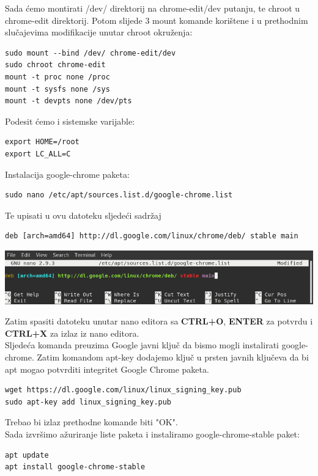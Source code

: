 \documentclass[12pt,vi]{mitthesis}
\begin{document}
Sada ćemo montirati /dev/ direktorij na chrome-edit/dev putanju, te chroot u chrome-edit direktorij. Potom slijede 3 mount komande korištene i u prethodnim slučajevima modifikacije unutar chroot okruženja:
\begin{lstlisting}[style=BashInputStyle]
sudo mount --bind /dev/ chrome-edit/dev
sudo chroot chrome-edit
mount -t proc none /proc
mount -t sysfs none /sys
mount -t devpts none /dev/pts
\end{lstlisting}

Podesit ćemo i sistemske varijable:
\begin{lstlisting}[style=BashInputStyle]
export HOME=/root
export LC_ALL=C
\end{lstlisting}

\noindent
Instalacija google-chrome paketa:
\begin{lstlisting}[style=BashInputStyle]
sudo nano /etc/apt/sources.list.d/google-chrome.list
\end{lstlisting}
Te upisati u ovu datoteku sljedeći sadržaj
\begin{lstlisting}[style=BashInputStyle]
deb [arch=amd64] http://dl.google.com/linux/chrome/deb/ stable main
\end{lstlisting}
\includegraphics[width=\linewidth]{images/google-chrome-list.png} 

Zatim spasiti datoteku unutar nano editora sa \textbf{CTRL+O}, \textbf{ENTER} za potvrdu i \textbf{CTRL+X} za izlaz iz nano editora.\\
Sljedeća komanda preuzima Google javni ključ da bismo mogli instalirati google-chrome. Zatim komandom apt-key dodajemo ključ u prsten javnih ključeva da bi apt mogao potvrditi integritet Google Chrome paketa.\\
\begin{lstlisting}[style=BashInputStyle]
wget https://dl.google.com/linux/linux_signing_key.pub
sudo apt-key add linux_signing_key.pub
\end{lstlisting}
Trebao bi izlaz prethodne komande biti "OK".\\
\indent
Sada izvršimo ažuriranje liste paketa i instaliramo google-chrome-stable paket:
\begin{lstlisting}[style=BashInputStyle]
apt update
apt install google-chrome-stable
\end{lstlisting}
\end{document}
